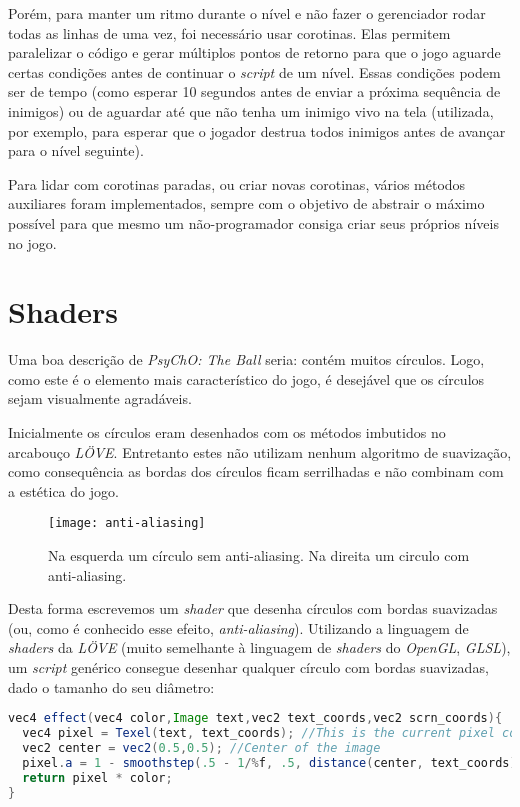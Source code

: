 Porém, para manter um ritmo durante o nível e não fazer o gerenciador rodar todas as linhas de uma vez, foi necessário usar corotinas. Elas permitem paralelizar o código e gerar múltiplos pontos de retorno para que o jogo aguarde certas condições antes de continuar o \textit{script} de um nível. Essas condições podem ser de tempo (como esperar 10 segundos antes de enviar a próxima sequência de inimigos) ou de aguardar até que não tenha um inimigo vivo na tela (utilizada, por exemplo, para esperar que o jogador destrua todos inimigos antes de avançar para o nível seguinte).

Para lidar com corotinas paradas, ou criar novas corotinas, vários métodos auxiliares foram implementados, sempre com o objetivo de abstrair o máximo possível para que mesmo um não-programador consiga criar seus próprios níveis no jogo.

\section{Shaders}
\label{sec:shaders}

Uma boa descrição de \textit{PsyChO: The Ball} seria: contém muitos círculos. Logo, como este é o elemento mais característico do jogo, é desejável que os círculos sejam visualmente agradáveis.

Inicialmente os círculos eram desenhados com os métodos imbutidos no arcabouço \textit{LÖVE}. Entretanto estes não utilizam nenhum algoritmo de suavização, como consequência as bordas dos círculos ficam serrilhadas e não combinam com a estética do jogo.

\begin{figure}[h!]
\texttt{[image: anti-aliasing]}
\centering
\caption{Na esquerda um círculo sem anti-aliasing. Na direita um circulo com anti-aliasing.}
\end{figure}

Desta forma escrevemos um \textit{shader} que desenha círculos com bordas suavizadas (ou, como é conhecido esse efeito, \textit{anti-aliasing}). Utilizando a linguagem de \textit{shaders} da \textit{LÖVE} (muito semelhante à linguagem de \textit{shaders} do \textit{OpenGL}, \textit{GLSL}), um \textit{script} genérico consegue desenhar qualquer círculo com bordas suavizadas, dado o tamanho do seu diâmetro:

\begin{lstlisting}[language=java]
vec4 effect(vec4 color,Image text,vec2 text_coords,vec2 scrn_coords){
  vec4 pixel = Texel(text, text_coords); //This is the current pixel color
  vec2 center = vec2(0.5,0.5); //Center of the image
  pixel.a = 1 - smoothstep(.5 - 1/%f, .5, distance(center, text_coords));
  return pixel * color;
}
\end{lstlisting}


